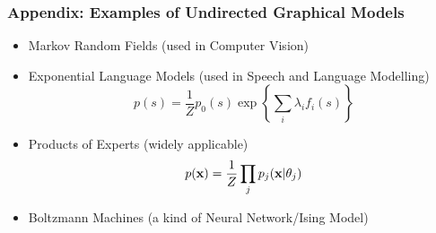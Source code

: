 \begin{frame}
\frametitle{Appendix: Examples of Undirected Graphical Models}

\begin{itemize}
\item Markov Random Fields (used in Computer Vision)
\hspace{12mm} 
\item Exponential Language Models (used in Speech and Language Modelling) 
\[
p(s) = \frac{1}{Z} p_0(s) \exp \left\{ \sum_i \lambda_i f_i(s) \right\}
\]
\item Products of Experts (widely applicable)
\[
p({\bf x}) = \frac{1}{Z} \prod_j p_j({\bf x} | \theta_j)
\]
\item Boltzmann Machines (a kind of Neural Network/Ising Model)
\hspace{12mm} 
\end{itemize}


\end{frame}

